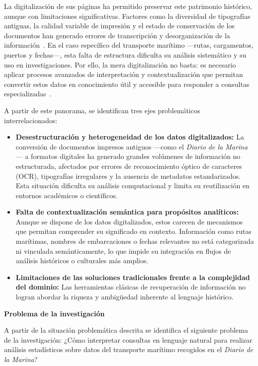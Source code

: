 La digitalización de sus páginas ha permitido preservar este patrimonio histórico, aunque con limitaciones significativas. Factores como la diversidad de tipografías antiguas, la calidad variable de impresión y el estado de conservación de los documentos han generado errores de transcripción y desorganización de la información~\cite{enhancing_degraded}. En el caso específico del transporte marítimo —rutas, cargamentos, puertos y fechas—, esta falta de estructura dificulta su análisis sistemático y su uso en investigaciones. Por ello, la mera digitalización no basta: es necesario aplicar procesos avanzados de interpretación y contextualización que permitan convertir estos datos en conocimiento útil y accesible para responder a consultas especializadas~\cite{ai_assisted, enhancing_degraded}.

A partir de este panorama, se identifican tres ejes problemáticos interrelacionados:

\begin{itemize}
	\item \textbf{Desestructuración y heterogeneidad de los datos digitalizados:} La conversión de documentos impresos antiguos —como el \textit{Diario de la Marina}— a formatos digitales ha generado grandes volúmenes de información no estructurada, afectados por errores de reconocimiento óptico de caracteres (OCR), tipografías irregulares y la ausencia de metadatos estandarizados. Esta situación dificulta su análisis computacional y limita su reutilización en entornos académicos o científicos.
	
	\item \textbf{Falta de contextualización semántica para propósitos analíticos:} Aunque se dispone de los datos digitalizados, estos carecen de mecanismos que permitan comprender su significado en contexto. Información como rutas marítimas, nombres de embarcaciones o fechas relevantes no está categorizada ni vinculada semánticamente, lo que impide su integración en flujos de análisis históricos o culturales más amplios.
	
	\item \textbf{Limitaciones de las soluciones tradicionales frente a la complejidad del dominio:} Las herramientas clásicas de recuperación de información no logran abordar la riqueza y ambigüedad inherente al lenguaje histórico.
\end{itemize}


\textbf{Problema de la investigación}

A partir de la situación problemática descrita se identifica el siguiente problema de la investigación: ¿Cómo interpretar consultas en lenguaje natural para realizar análisis estadísticos sobre datos del transporte marítimo recogidos en el \textit{Diario de la Marina}?


